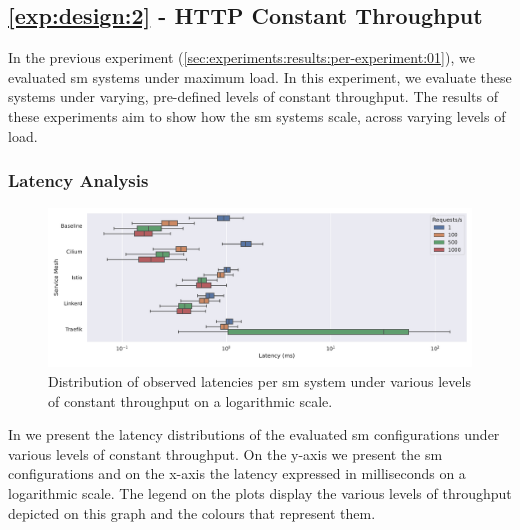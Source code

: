 \subsection{\ref{exp:design:2} - HTTP Constant Throughput}
\label{sec:experiments:results:per-experiment:02}

In the previous experiment (\cref{sec:experiments:results:per-experiment:01}), we evaluated \gls{sm} systems under maximum load. In this experiment, we evaluate these systems under varying, pre-defined levels of constant throughput. The results of these experiments aim to show how the \gls{sm} systems scale, across varying levels of load.

\subsubsection{Latency Analysis}
\label{sec:experiments:results:per-experiment:02:latency}

\begin{figure}[!t]
    \centering
    
    \includegraphics[width=1\linewidth]{5_experimental_evaluation/figures/exp-02-latency-log.pdf}
    
    \caption[Distribution of observed latencies per \gls{sm} system under various levels of constant throughput]{Distribution of observed latencies per \gls{sm} system under various levels of constant throughput on a logarithmic scale.}
    
    \label{fig:exp:02:latency-distributions}
\end{figure}


In \label{fig:exp:02:latency-distributions} we present the latency distributions of the evaluated \gls{sm} configurations under various levels of constant throughput.  On the y-axis we present the \gls{sm} configurations and on the x-axis the latency expressed in milliseconds on a logarithmic scale. The legend on the plots display the various levels of throughput depicted on this graph and the colours that represent them.

